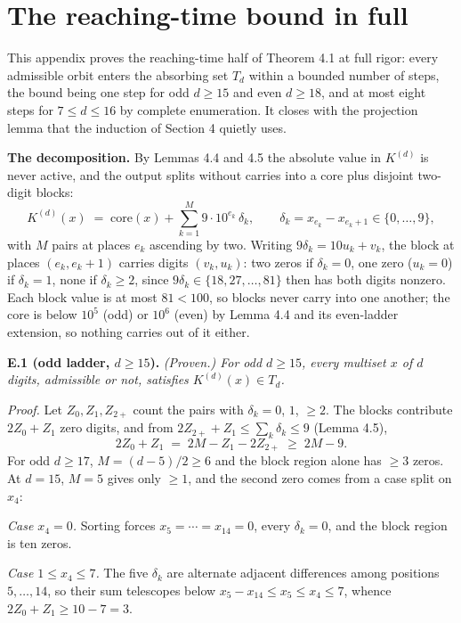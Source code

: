 \documentclass[11pt,letterpaper]{article}
\theoremstyle{paperstyle}
\theoremstyle{paperstyledef}
\theoremstyle{paperstylerem}
\begin{document}
\section{The reaching-time bound in full}\label{the-reaching-time-bound-in-full}

This appendix proves the reaching-time half of Theorem 4.1 at full rigor: every admissible orbit enters the absorbing set \(T_d\) within a bounded number of steps, the bound being one step for odd \(d \geq 15\) and even \(d \geq 18\), and at most eight steps for \(7 \leq d \leq 16\) by complete enumeration. It closes with the projection lemma that the induction of Section 4 quietly uses.

\textbf{The decomposition.} By Lemmas 4.4 and 4.5 the absolute value in \(K^{(d)}\) is never active, and the output splits without carries into a core plus disjoint two-digit blocks: \[K^{(d)}(x) \;=\; \mathrm{core}(x) + \sum_{k=1}^{M} 9 \cdot 10^{e_k}\, \delta_k, \qquad \delta_k = x_{e_k} - x_{e_k + 1} \in \{0, \dots, 9\},\] with \(M\) pairs at places \(e_k\) ascending by two. Writing \(9\delta_k = 10u_k + v_k\), the block at places \((e_k, e_k + 1)\) carries digits \((v_k, u_k)\): two zeros if \(\delta_k = 0\), one zero (\(u_k = 0\)) if \(\delta_k = 1\), none if \(\delta_k \geq 2\), since \(9\delta_k \in \{18, 27, \dots, 81\}\) then has both digits nonzero. Each block value is at most \(81 < 100\), so blocks never carry into one another; the core is below \(10^5\) (odd) or \(10^6\) (even) by Lemma 4.4 and its even-ladder extension, so nothing carries out of it either.

\textbf{E.1 (odd ladder, \(d \geq 15\)).} \emph{(Proven.) For odd \(d \geq 15\), every multiset \(x\) of \(d\) digits, admissible or not, satisfies \(K^{(d)}(x) \in T_d\).}

\emph{Proof.} Let \(Z_0, Z_1, Z_{2+}\) count the pairs with \(\delta_k = 0\), \(1\), \(\geq 2\). The blocks contribute \(2Z_0 + Z_1\) zero digits, and from \(2Z_{2+} + Z_1 \leq \sum_k \delta_k \leq 9\) (Lemma 4.5), \[2Z_0 + Z_1 \;=\; 2M - Z_1 - 2Z_{2+} \;\geq\; 2M - 9.\] For odd \(d \geq 17\), \(M = (d-5)/2 \geq 6\) and the block region alone has \(\geq 3\) zeros. At \(d = 15\), \(M = 5\) gives only \(\geq 1\), and the second zero comes from a case split on \(x_4\):

\emph{Case \(x_4 = 0\).} Sorting forces \(x_5 = \cdots = x_{14} = 0\), every \(\delta_k = 0\), and the block region is ten zeros.

\emph{Case \(1 \leq x_4 \leq 7\).} The five \(\delta_k\) are alternate adjacent differences among positions \(5, \dots, 14\), so their sum telescopes below \(x_5 - x_{14} \leq x_5 \leq x_4 \leq 7\), whence \(2Z_0 + Z_1 \geq 10 - 7 = 3\).
\end{document}
